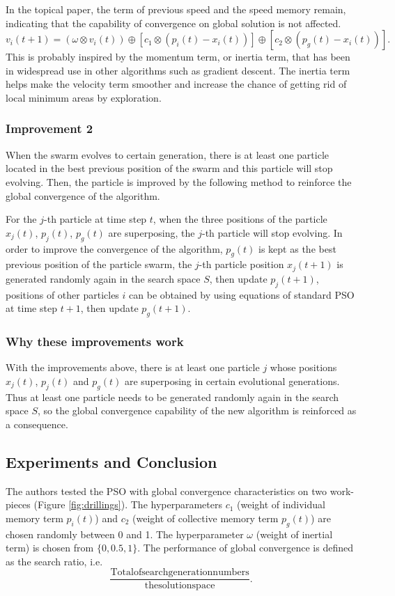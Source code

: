 \documentclass{IEEEtran}
\begin{document}
{{{            In the topical paper, the term of previous speed and the speed memory remain, indicating that the capability of convergence on global solution is not affected.
            $$v_i(t+1) = (\omega \otimes v_i(t)) \oplus [c_1 \otimes (p_i(t) - x_i(t))] \oplus [c_2 \otimes (p_g(t) - x_i(t))].$$
            This is probably inspired by the momentum term, or inertia term, that has been in widespread use in other algorithms such as gradient descent.
            The inertia term helps make the velocity term smoother and increase the chance of getting rid of local minimum areas by exploration.
        }

        \subsubsection{Improvement 2}
        {
            When the swarm evolves to certain generation, 
            there is at least one particle located in the best previous position of the swarm and this particle will stop evolving. 
            Then, the particle is improved by the following method to reinforce the global convergence of the algorithm.

            For the $j$-th particle at time step $t$, when the three positions of the particle $x_j(t)$, $p_j(t)$, $p_g(t)$ are superposing, the $j$-th particle will stop evolving. 
            In order to improve the convergence of the algorithm, $p_g(t)$ is kept as the best previous position of the particle swarm, 
            the $j$-th particle position $x_j(t+1)$ is generated randomly again in the search space $S$, then update $p_j(t+1)$, 
            positions of other particles $i$ can be obtained by using equations of standard PSO at time step $t+1$, then update $p_g(t+1)$.
        }

        \subsubsection{Why these improvements work}
        {
            With the improvements above, there is at least one particle $j$ whose positions $x_j(t)$, $p_j(t)$ and $p_g(t)$ are superposing in certain evolutional generations. 
            Thus at least one particle needs to be generated randomly again in the search space $S$, so the global convergence capability of the new algorithm is reinforced as a consequence.
        }
    }

    \subsection{Experiments and Conclusion}
    {
        The authors tested the PSO with global convergence characteristics on two work-pieces (Figure \ref{fig:drillings}).
        The hyperparameters $c_1$ (weight of individual memory term $p_i(t)$) and $c_2$ (weight of collective memory term $p_g(t)$) are chosen randomly between 0 and 1.
        The hyperparameter $\omega$ (weight of inertial term) is chosen from $\{ 0, 0.5, 1 \}$.
        The performance of global convergence is defined as the search ratio, i.e.
        $$\frac{\mathrm{Total of search generation numbers}}{\mathrm{the solution space}}.$$

}}
\end{document}
